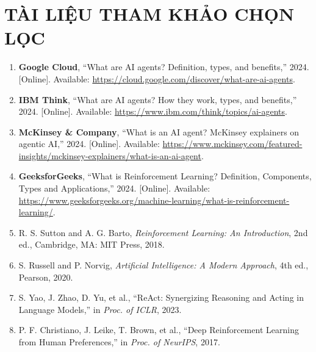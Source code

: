 \documentclass[12pt,a4paper]{article}
\begin{document}
\section*{TÀI LIỆU THAM KHẢO CHỌN LỌC}
\footnotesize
\begin{enumerate}
    \item[{[1]}] \textbf{Google Cloud}, ``What are AI agents? Definition, types, and benefits,'' 2024. [Online]. Available: \url{https://cloud.google.com/discover/what-are-ai-agents}.
    \item[{[2]}] \textbf{IBM Think}, ``What are AI agents? How they work, types, and benefits,'' 2024. [Online]. Available: \url{https://www.ibm.com/think/topics/ai-agents}.
    \item[{[3]}] \textbf{McKinsey \& Company}, ``What is an AI agent? McKinsey explainers on agentic AI,'' 2024. [Online]. Available: \url{https://www.mckinsey.com/featured-insights/mckinsey-explainers/what-is-an-ai-agent}.
    \item[{[4]}] \textbf{GeeksforGeeks}, ``What is Reinforcement Learning? Definition, Components, Types and Applications,'' 2024. [Online]. Available: \url{https://www.geeksforgeeks.org/machine-learning/what-is-reinforcement-learning/}.
    \item[{[5]}] R. S. Sutton and A. G. Barto, \textit{Reinforcement Learning: An Introduction}, 2nd ed., Cambridge, MA: MIT Press, 2018.
    \item[{[6]}] S. Russell and P. Norvig, \textit{Artificial Intelligence: A Modern Approach}, 4th ed., Pearson, 2020.
    \item[{[7]}] S. Yao, J. Zhao, D. Yu, et al., ``ReAct: Synergizing Reasoning and Acting in Language Models,'' in \textit{Proc. of ICLR}, 2023.
    \item[{[8]}] P. F. Christiano, J. Leike, T. Brown, et al., ``Deep Reinforcement Learning from Human Preferences,'' in \textit{Proc. of NeurIPS}, 2017.
\end{enumerate}
\end{document}
